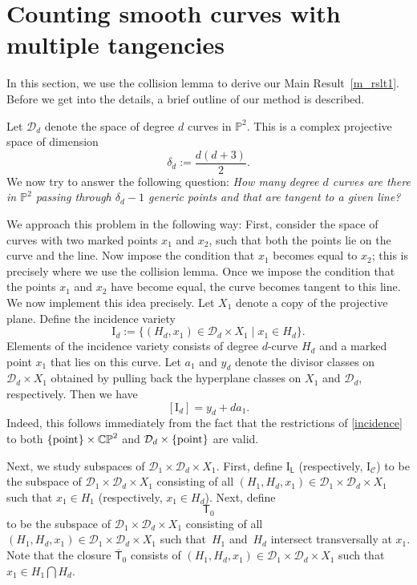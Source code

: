 \section{Counting smooth curves with multiple tangencies}\label{smooth_tangencies}
\label{smooth_curves_enum}
In this section, we use the collision lemma to derive our Main Result~\ref{m_rslt1}.
Before we get into the details, a brief outline of our method is described.

Let $\mathcal{D}_d$
denote the space of degree $d$ curves in $\mathbb{P}^2$. This is a complex projective space of dimension
\begin{equation}\label{eb}
\delta_d :=  \frac{d(d+3)}{2}.
\end{equation}
We now try to answer the following question:
{\it How many degree $d$ curves are there in $\mathbb{P}^2$ passing through
$\delta_d-1$ generic points and that are tangent to a given line?}

We approach this problem in the following way: First, consider the space of curves with two marked points $x_1$ and $x_2$, such that
both the points lie on the curve and the line. Now
impose the condition that $x_1$ becomes equal to $x_2$; this is precisely where
we use the collision lemma.
Once we impose the condition that the points $x_1$ and $x_2$
have become equal,
the curve becomes tangent to this line.
We now implement this idea precisely.
Let $X_1$ denote a copy of the projective plane. Define
the incidence variety
\begin{equation}\label{f1}
\mathrm{I}_d := \{ (H_d, x_1) \in  \mathcal{D}_d \times X_1 \mid  x_1 \in H_d\}.
\end{equation}
Elements of the incidence variety consists of
degree $d$-curve $H_d$ and a marked point $x_1$ that lies on this curve.
Let $a_1$ and $y_d$ denote the divisor classes on $\mathcal{D}_d \times X_1$ obtained by pulling back the
hyperplane classes on $X_1$ and $\mathcal{D}_d$, respectively. Then we have
\begin{equation}\label{incidence}
[\mathrm{I}_d]  =  y_d + d a_1.
\end{equation}
Indeed, this follows immediately from the fact that the restrictions of \eqref{incidence} to both
$\{{\rm point}\}\times \mathbb{CP}^2$ and $\mathcal{D}_d \times \{{\rm point}\}$ are valid.

Next, we study subspaces of $\mathcal{D}_1 \times \mathcal{D}_d \times X_1$.
First, define
$\mathrm{I}_{\mathsf{L}}$ (respectively, $\mathrm{I}_{\mathcal{C}}$)
to be the subspace of $\mathcal{D}_1 \times \mathcal{D}_d \times X_1$ consisting of all
$(H_1, H_d, x_1)  \in \mathcal{D}_1 \times \mathcal{D}_d \times X_1$
such that $x_1 \in H_1$ (respectively, $x_1 \in H_d$).
Next, define
\begin{equation}
\label{et}
\mathsf{T}_0
\end{equation}
to be the subspace
of $\mathcal{D}_1 \times \mathcal{D}_d \times X_1$ consisting of all
$(H_1, H_d, x_1)  \in \mathcal{D}_1 \times \mathcal{D}_d \times X_1$ such that~$H_1$ and~$H_d$ intersect transversally at $x_1$.
Note that the closure $\overline{\mathsf{T}}_0$ consists of
$(H_1, H_d, x_1)  \in \mathcal{D}_1 \times \mathcal{D}_d \times X_1$
such that $x_1 \in H_1\bigcap H_d$.

